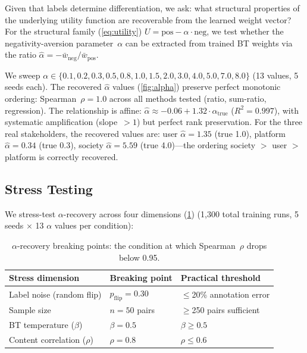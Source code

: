 \documentclass[11pt,letterpaper]{article}
\newcommand{\alphaspearman}{1.0}
\begin{document}
Given that labels determine differentiation, we ask: what structural
properties of the underlying utility function are recoverable from
the learned weight vector? For the structural family (\cref{eq:utility})
$U = \text{pos} - \alpha \cdot \text{neg}$, we test whether the
negativity-aversion parameter~$\alpha$ can be extracted from trained
BT weights via the ratio
$\hat\alpha = -\bar{w}_{\text{neg}} / \bar{w}_{\text{pos}}$.

We sweep $\alpha \in \{0.1, 0.2, 0.3, 0.5, 0.8, 1.0, 1.5, 2.0,
3.0, 4.0, 5.0, 7.0, 8.0\}$ (13 values, 5 seeds each). The
recovered $\hat\alpha$ values (\cref{fig:alpha}) preserve perfect monotonic ordering:
Spearman~$\rho = \alphaspearman$ across all methods tested (ratio,
sum-ratio, regression). The relationship is affine:
$\hat\alpha \approx -0.06 + 1.32 \cdot \alpha_{\text{true}}$
($R^2 = 0.997$), with systematic amplification (slope~$> 1$) but
perfect rank preservation. For the three real stakeholders, the
recovered values are: user $\hat\alpha = 1.35$ (true 1.0), platform
$\hat\alpha = 0.34$ (true 0.3), society $\hat\alpha = 5.59$ (true
4.0)---the ordering society $>$ user $>$ platform is correctly
recovered.

\subsection{Stress Testing}
\label{sec:stress}

We stress-test $\alpha$-recovery across four dimensions (\cref{tab:stress}) (1{,}300
total training runs, 5 seeds $\times$ 13 $\alpha$ values per
condition):

\begin{table}[t]
  \caption{$\alpha$-recovery breaking points: the condition at which
    Spearman~$\rho$ drops below 0.95.}
  \label{tab:stress}
  \centering\small
  \begin{tabular}{lll}
    \toprule
    \textbf{Stress dimension} & \textbf{Breaking point} & \textbf{Practical threshold} \\
    \midrule
    Label noise (random flip) & $p_{\text{flip}} = 0.30$ & $\leq$20\% annotation error \\
    Sample size & $n = 50$ pairs & $\geq$250 pairs sufficient \\
    BT temperature ($\beta$) & $\beta = 0.5$ & $\beta \geq 0.5$ \\
    Content correlation ($\rho$) & $\rho = 0.8$ & $\rho \leq 0.6$ \\
    \bottomrule
  \end{tabular}
\end{table}
\end{document}
